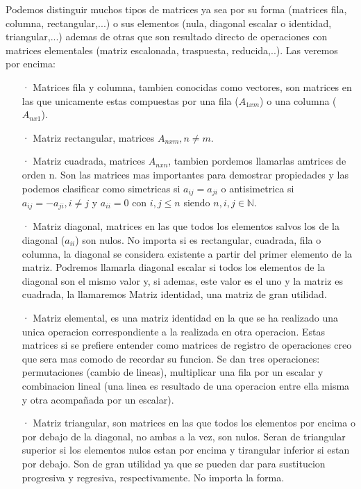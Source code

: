 \documentclass[11pt,a4paper]{article}
\begin{document}
Podemos distinguir muchos tipos de matrices ya sea por su forma (matrices fila, columna, rectangular,...) o sus elementos (nula, diagonal escalar o identidad, triangular,...) ademas de otras que son resultado directo de operaciones con matrices elementales (matriz escalonada, traspuesta, reducida,..). Las veremos por encima:
\begin{enumerate}
\item[·]Matrices fila y columna, tambien conocidas como vectores, son matrices en las que unicamente estas compuestas por una fila ($A_{1xm}$) o una columna ($A_{nx1}$).

\item[·]Matriz rectangular, matrices $A_{nxm},n\neq m$.

\item[·]Matriz cuadrada,  matrices $A_{nxn}$, tambien pordemos llamarlas amtrices de orden n. Son las matrices mas importantes para demostrar propiedades y las podemos clasificar como simetricas si $a_{ij}=a_{ji}$ o antisimetrica si $a_{ij}=-a_{ji}, i\neq j$ y $a_{ii}=0$ con $i,j\leq n$ siendo $n,i,j\in \mathbb{N}$.

\item[·]Matriz diagonal, matrices en las que todos los elementos salvos los de la diagonal ($a_{ii}$) son nulos. No importa si es rectangular, cuadrada, fila o columna, la diagonal se considera existente a partir del primer elemento de la matriz. Podremos llamarla diagonal escalar si todos los elementos de la diagonal son el mismo valor y, si ademas, este valor es el uno y la matriz es cuadrada, la llamaremos Matriz identidad, una matriz de gran utilidad.

\item[·]Matriz elemental, es una matriz identidad en la que se ha realizado una unica operacion correspondiente a la realizada en otra operacion. Estas matrices si se prefiere entender como matrices de registro de operaciones creo que sera mas comodo de recordar su funcion. Se dan tres operaciones: permutaciones (cambio de lineas), multiplicar una fila por un escalar y combinacion lineal (una linea es resultado de una operacion entre ella misma y otra acompañada por un escalar).

\item[·]Matriz triangular, son matrices en las que todos los elementos por encima o por debajo de la diagonal, no ambas a la vez, son nulos. Seran de triangular superior si los elementos nulos estan por encima y tirangular inferior si estan por debajo. Son de gran utilidad ya que se pueden dar para sustitucion progresiva y regresiva, respectivamente. No importa la forma.


\end{enumerate}
\end{document}

